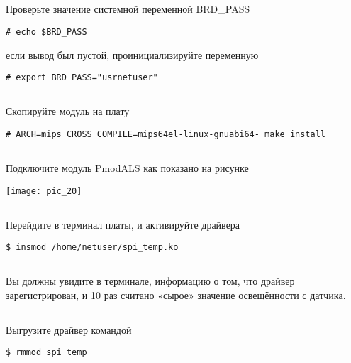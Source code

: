 \subsection{}Проверьте значение системной переменной BRD\_PASS  
\begin{lstlisting}[style=bash]
	# echo $BRD_PASS
\end{lstlisting}
если вывод был пустой, проинициализируйте переменную 
\begin{lstlisting}[style=bash]
	# export BRD_PASS="usrnetuser" 
\end{lstlisting}

\subsection{}Скопируйте модуль на плату
\begin{lstlisting}[style=bash]
	# ARCH=mips CROSS_COMPILE=mips64el-linux-gnuabi64- make install
\end{lstlisting}

\subsection{}Подключите модуль PmodALS как показано на рисунке 
\begin{center}
	\texttt{[image: pic\_20]}
\end{center}

\subsection{}Перейдите в терминал платы, и активируйте драйвера
\begin{lstlisting}[style=bash]
$ insmod /home/netuser/spi_temp.ko 
\end{lstlisting}

\subsection{}Вы должны увидите в терминале, информацию о том, что драйвер зарегистрирован, и 10 раз считано «сырое» значение освещённости с датчика.

\subsection{}Выгрузите драйвер командой
\begin{lstlisting}[style=bash]
$ rmmod spi_temp
\end{lstlisting}

